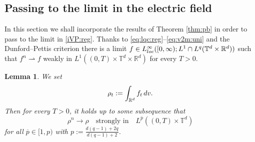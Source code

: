 \documentclass[11pt,reqno,a4paper]{amsart}
\newcommand{\R}{\mathbb{R}}
\newcommand{\ov}{\overline}
\newtheorem{lemma}{Lemma}[section]
\theoremstyle{definition}
\theoremstyle{remark}
\numberwithin{equation}{section}
\newcommand{\T} {\mathbb T}
\newcommand{\weakto}{\rightharpoonup}
\newcommand{\intr}{\int_{\R^d}}
\newcommand{\dv}{\textnormal{d}v}
\begin{document}
%
%
%
%
%

\subsection{Passing to the limit in the electric field}

In this section we shall incorporate the results of Theorem \ref{thm:pb} in order to pass to the limit in \eqref{iVP:reg}. Thanks to \eqref{eq:lqc:reg}--\eqref{eq:v2m:uni} and the Dunford--Pettis criterion there is a limit $f\in L^\infty_{\rm loc}([0,\infty); L^1\cap L^q(\T^d\times \R^d))$ such that $f^n \weakto f$ weakly in $L^1((0,T)\times \T^d \times \R^d)$ for every $T>0$.

\begin{lemma}\label{lem:rho:strongconv}
    We set 
    \[
\rho_t:=\intr f_t \,\dv.
\]
Then for every $T>0$, it holds up to some subsequence that
\begin{equation*}
    \rho^n \to \rho \quad \text{strongly in} \quad L^{\ov{p}}((0,T)\times \T^d)
\end{equation*}
for all $\ov{p}\in [1,p)$ with $p := \frac{d(q-1)+2q}{d(q-1)+2}$.
\end{lemma}
\end{document}
